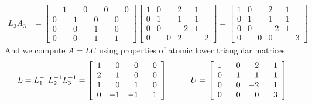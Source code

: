 \begin{example}
\begin{align*}
L_3 A_3 &=
\left[ \begin{array}{rrrr} \phantom{+}1 & \phantom{+}0 & \phantom{+}0 & \phantom{+}0 \\ 0 & 1 & 0 & 0 \\ 0 & 0 & 1 & 0 \\ 0 & 0 & 1 & 1 \end{array} \right]
\left[ \begin{array}{rrrr} 1 & 0 & 2 & 1 \\ 0 & 1 & 1 & 1 \\ 0 & 0 & -2 & 1 \\ 0 & \phantom{+}0 & 2 & \phantom{+}2 \end{array} \right]
=
\left[ \begin{array}{rrrr} 1 & 0 & 2 & 1 \\ 0 & 1 & 1 & 1 \\ 0 & 0 & -2 & 1 \\ 0 & \phantom{+}0 & 0 & \phantom{+}3 \end{array} \right]
\end{align*}
And we compute $A = LU$ using properties of atomic lower triangular matrices
$$
L
=
L_1^{-1} L_2^{-1} L_3^{-1}
=
\left[ \begin{array}{rrrr} 1 & 0 & 0 & 0 \\ 2 & 1 & 0 & 0 \\ 1 & 0 & 1 & 0 \\ 0 & -1 & -1 & \phantom{+}1 \end{array} \right]
\hspace{10mm}
U = \left[ \begin{array}{rrrr} 1 & 0 & 2 & 1 \\ 0 & 1 & 1 & 1 \\ 0 & 0 & -2 & 1 \\ 0 & \phantom{+}0 & 0 & \phantom{+}3 \end{array} \right]
$$
\end{example}

